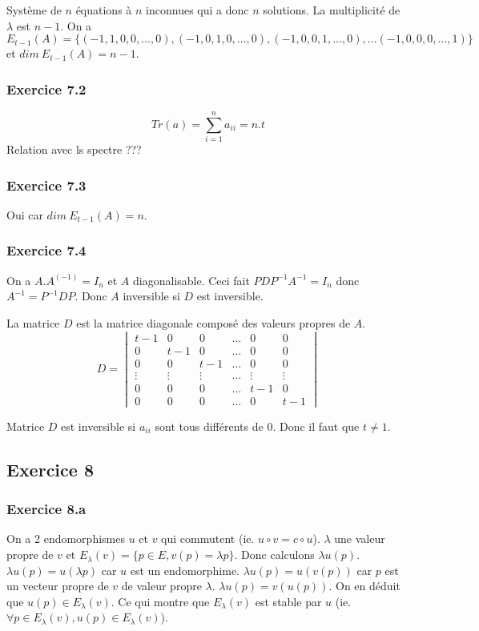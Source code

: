 \documentclass[]{book}
\theoremstyle{definition}
\begin{document}
Syst\`eme de $n$ \'equations \`a $n$ inconnues qui a donc $n$ solutions. La multiplicit\'e de $\lambda$ est $n-1$. On a $E_{t-1}(A) = \{(-1,1,0,0,\ldots,0),(-1,0,1,0,\ldots,0), (-1,0,0,1,\ldots,0), \dots (-1,0,0,0,\ldots,1)\}$ et $dim\ E_{t-1}(A) = n-1$. 

\subsubsection*{Exercice 7.2}
$$Tr(a)=\sum_{i=1}^{n}a_{ii} = n.t$$ 
Relation avec ls spectre ???

\subsubsection*{Exercice 7.3}
Oui car $dim\ E_{t-1}(A) = n$.

\subsubsection*{Exercice 7.4}
On a $A.A^(-1) = I_n$ et $A$ diagonalisable. Ceci fait $PDP^{-1}A^{-1} = I_n$ donc $A^{-1} = P^{-1}DP$. Donc $A$ inversible si $D$ est inversible.
 
La matrice $D$ est la matrice diagonale compos\'e des valeurs propres de $A$. 
$$D=\begin{vmatrix} t-1 & 0 & 0 & \ldots & 0 & 0 \\ 0 & t-1 & 0 & \ldots & 0 & 0 \\ 0 & 0 & t-1 & \ldots & 0 & 0 \\ \vdots & \vdots & \vdots & \ldots & \vdots & \vdots \\ 0 & 0 & 0 & \ldots & t-1 & 0 \\ 0 & 0 & 0 & \ldots & 0 & t-1 \end{vmatrix}$$

Matrice $D$ est inversible si $a_{ii}$ sont tous diff\'erents de 0. Donc il faut que $t \neq 1$.


\subsection*{Exercice 8}
\subsubsection*{Exercice 8.a}
On a 2 endomorphismes $u$ et $v$ qui commutent (ie. $u \circ v = c \circ u$). $\lambda$ une valeur propre de $v$ et $E_{\lambda}(v) = \{p \in E, v(p) = \lambda p\}$. Donc calculons $\lambda u(p)$.  $\lambda u(p) = u(\lambda p)$ car $u$ est un endomorphime. $\lambda u(p) = u(v(p))$ car $p$ est un vecteur propre de $v$ de valeur propre $\lambda$. $\lambda u(p) = v(u(p))$. On en d\'eduit que $u(p) \in E_{\lambda}(v)$. Ce qui montre que $E_{\lambda}(v)$ est stable par $u$ (ie. $\forall p \in E_{\lambda}(v), u(p) \in E_{\lambda}(v)$).
\end{document}
